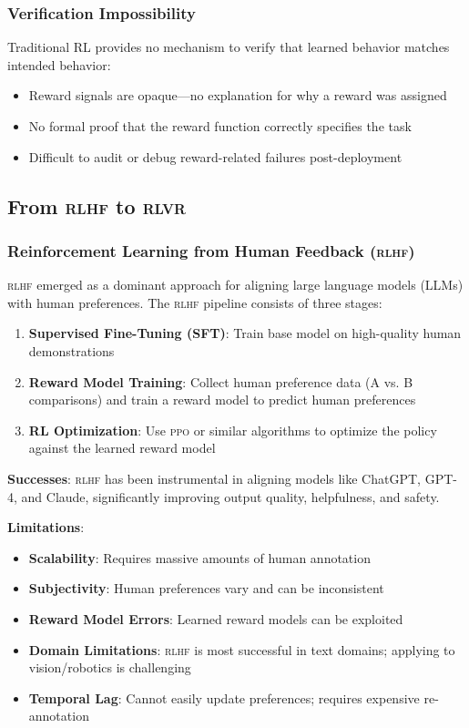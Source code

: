 \documentclass[11pt,a4paper]{article}
\newcommand{\rlvr}{\textsc{rlvr}}
\newcommand{\rlhf}{\textsc{rlhf}}
\newcommand{\ppo}{\textsc{ppo}}
\begin{document}
\subsubsection{Verification Impossibility}

Traditional RL provides no mechanism to verify that learned behavior matches intended behavior:

\begin{itemize}[leftmargin=*]
    \item Reward signals are opaque---no explanation for why a reward was assigned
    \item No formal proof that the reward function correctly specifies the task
    \item Difficult to audit or debug reward-related failures post-deployment
\end{itemize}

\subsection{From \rlhf{} to \rlvr{}}
\label{sec:rlhf_to_rlvr}

\subsubsection{Reinforcement Learning from Human Feedback (\rlhf{})}

\rlhf{} emerged as a dominant approach for aligning large language models (LLMs) with human preferences. The \rlhf{} pipeline consists of three stages:

\begin{enumerate}[leftmargin=*]
    \item \textbf{Supervised Fine-Tuning (SFT)}: Train base model on high-quality human demonstrations
    \item \textbf{Reward Model Training}: Collect human preference data (A vs. B comparisons) and train a reward model to predict human preferences
    \item \textbf{RL Optimization}: Use \ppo{} or similar algorithms to optimize the policy against the learned reward model
\end{enumerate}

\textbf{Successes}: \rlhf{} has been instrumental in aligning models like ChatGPT, GPT-4, and Claude, significantly improving output quality, helpfulness, and safety.

\textbf{Limitations}:
\begin{itemize}[leftmargin=*]
    \item \textbf{Scalability}: Requires massive amounts of human annotation
    \item \textbf{Subjectivity}: Human preferences vary and can be inconsistent
    \item \textbf{Reward Model Errors}: Learned reward models can be exploited
    \item \textbf{Domain Limitations}: \rlhf{} is most successful in text domains; applying to vision/robotics is challenging
    \item \textbf{Temporal Lag}: Cannot easily update preferences; requires expensive re-annotation
\end{itemize}
\end{document}
